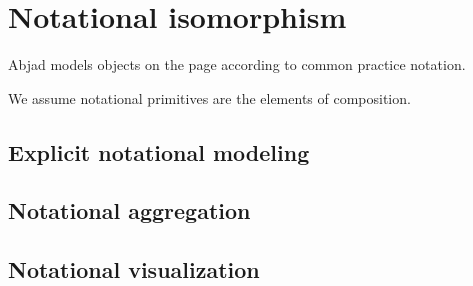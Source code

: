 \section{Notational isomorphism}\label{sec:notational_isomorphism}

Abjad models objects on the page according to common practice notation.

We assume notational primitives are the elements of composition.

\subsection{Explicit notational modeling}

\subsection{Notational aggregation}

\subsection{Notational visualization}
